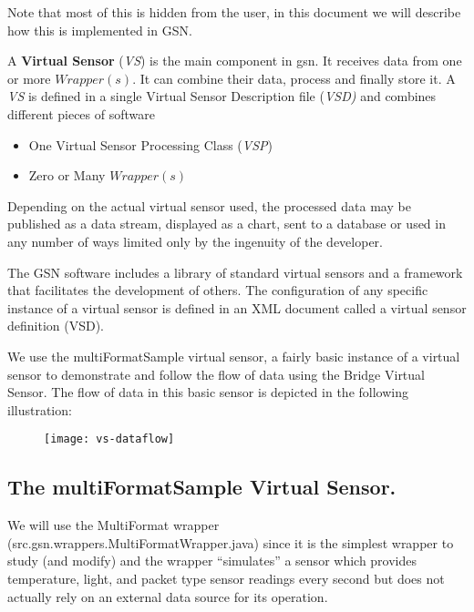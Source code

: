 Note that most of this is hidden from the user, in this document we
will describe how this is implemented in GSN.



A \textbf{Virtual Sensor} (\textit{VS}) is the main component in gsn.
It receives data from one or more \begin{math}Wrapper(s)\end{math}. It
can combine their data, process and finally store it. A \textit{VS} is
defined in a single  Virtual Sensor Description file (\textit{VSD)} and
combines different pieces of software

\begin{itemize}
	\item One Virtual Sensor Processing Class (\textit{VSP})
	\item Zero or Many \begin{math}Wrapper(s)\end{math}
\end{itemize}

Depending on the actual virtual sensor used, the processed data may be
published as a data stream, displayed as a chart, sent to a database or
used in any number of ways limited only by the ingenuity of the
developer.

The GSN software includes a library of standard virtual sensors and a
framework that facilitates the development of others.  The
configuration of any specific instance of a virtual sensor is defined
in an XML document called a virtual sensor definition (VSD).

We use the multiFormatSample virtual sensor, a fairly basic instance
of a virtual sensor to demonstrate and follow the flow of data using
the Bridge Virtual Sensor.  The flow of data in this basic sensor is
depicted in the following illustration:

\begin{figure}%
  \centering
  \texttt{[image: vs-dataflow]}
  \caption{}
  \label{fig:tutorial-vs}
\end{figure}

\subsection{The multiFormatSample Virtual Sensor.}

We will use the MultiFormat wrapper
(src.gsn.wrappers.MultiFormatWrapper.java) since it is the simplest
wrapper to study (and modify) and the wrapper
\textquotedblleft{}simulates\textquotedblright{} a sensor which
provides temperature, light, and packet type sensor readings every
second but does not actually rely on an external data source for its
operation.

